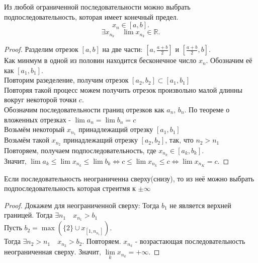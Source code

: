 \documentclass[11pt, oneside]{article}   	%
\begin{document}
    \begin{theorem} \label{bolz-weier}
        Из любой ограниченной последовательности можно выбрать подпоследовательность, которая имеет конечный предел.\\
        \[ x_n\in \left[a, b\right] .\]
        \[ \exists{x_{n_k}}\quad \lim x_{n_k}\in \mathbb{R} .\] 
        \begin{proof}
            Разделим отрезок $\left[a,b\right]$ на две части: $\left[a, \frac{a+b}{2}\right]$ и $ \left[\frac{a+b}{2}, b\right]$.\\
            Как минмум в одной из половин находится бесконечное число $x_n$. Обозначим её как $ \left[a_1, b_1\right]$.\\
            Повторим разеделение, получим отрезок $ \left[a_2, b_2\right] \subset [a_1, b_1]$\\
            Повторяя такой процесс можем получить отрезок произвольно малой длинны вокруг некоторой точки $c$.\\
            Обозначим последовательности границ отрезков как $a_n$, $b_n$. По теореме о вложенных отрезках -  $\lim a_n = \lim b_n = c$\\
            Возьмём некоторый $x_{n_1}$ принадлежащий отрезку $ \left[a_1,b_1\right]$\\
            Возьмём такой $x_{n_2}$ принадлежащий отрезку $ \left[a_2, b_2\right]$, так, что $n_2>n_1$\\
            Повторяем, получаем подпоследовательность, где $x_{n_k}\in \left[a_k, b_k\right]$.\\
            Значит, $\lim a_k \le \lim x_{n_k} \le \lim b_k \iff c \le \lim x_{n_k} \le c \iff \lim x_{n_K} = c$.
        \end{proof}
    \end{theorem}
    \begin{tlemma}
        Если последовательность неограниченна сверху(снизу), то из неё можно выбрать подпоследовательность которая стреитмя к $\pm\infty$
        \begin{proof}
           Докажем для неограниченной сверху:
           Тогда $b_1$ не является верхней границей. Тогда $\exists{n_1}\quad x_{n_1} > b_1 $ \\
           Пусть $b_2 = \max\left( \{2\} \cup x_{\left[1, n_{n_1}\right]}  \right) $.\\
           Тогда $\exists{n_2 > n_1}\quad x_{n_2} > b_2$.
           Повторяем. $x_{n_k}$ - возрастающая последовательность неограниченная сверху. Значит, $\lim\limits_k x_{n_k} = +\infty$. 
        \end{proof}
    \end{tlemma}
\end{document}
